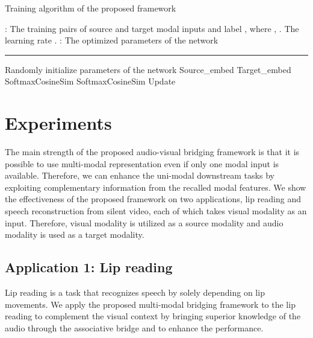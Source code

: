 \documentclass[10pt,twocolumn,letterpaper]{article}
\begin{document}
\makeatletter
\renewcommand{\ALG@beginalgorithmic}{\small}
\algrenewcommand{}
\makeatother
\begin{algorithm}[t!]
  \caption{Training algorithm of the proposed framework}
    \label{alg:1}
    \begin{algorithmic}[1]
        : The training pairs of source and target modal inputs  and label , where , . The learning rate .
        : The optimized parameters of the network 
        \vspace{0.05in}
        \hrule
        \vspace{0.05in}
        \State Randomly initialize parameters of the network 
            \State Source\_embed
            \State Target\_embed
            \For{}
                \State SoftmaxCosineSim
                \State SoftmaxCosineSim
                \State  
                \State 
            \EndFor
        \State     
        \State   
        \State 
        \State 
        \State Update 
        \EndFor
    \end{algorithmic}
\end{algorithm}



\section{Experiments}
The main strength of the proposed audio-visual bridging framework is that it is possible to use multi-modal representation even if only one modal input is available. Therefore, we can enhance the uni-modal downstream tasks by exploiting complementary information from the recalled modal features. We show the effectiveness of the proposed framework on two applications, lip reading and speech reconstruction from silent video, each of which takes visual modality as an input. Therefore, visual modality is utilized as a source modality and audio modality is used as a target modality.

\subsection{Application 1: Lip reading}
\label{sec:4.1}
Lip reading is a task that recognizes speech by solely depending on lip movements. We apply the proposed multi-modal bridging framework to the lip reading to complement the visual context by bringing superior knowledge of the audio through the associative bridge and to enhance the performance.
\end{document}
